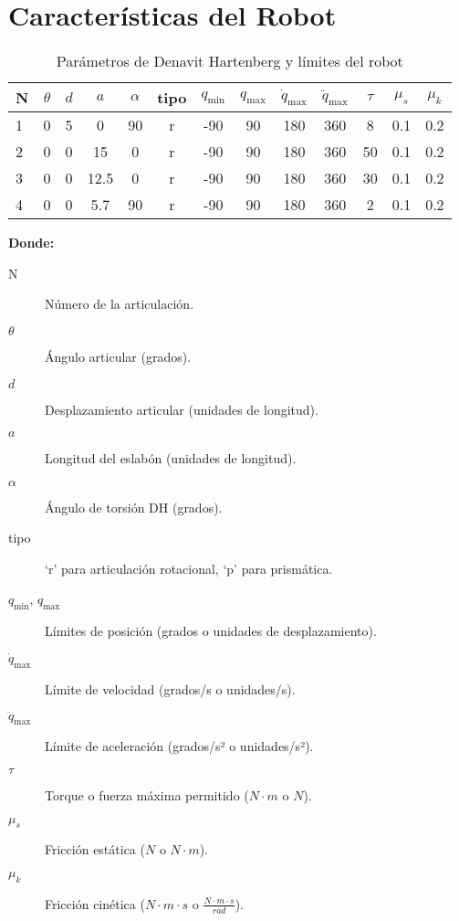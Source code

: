 \section{Características del Robot} \label{sec:caracteristicas_del_robot}


\begin{table}[ht]
	\centering
	\caption{Parámetros de Denavit Hartenberg y límites del robot}
	\label{tab:parametros_robot}
	\begin{tabular}{ l|cccccccccccc
		}
		\toprule
		N & {$\theta$} & {$d$} & {$a$} & {$\alpha$} & {tipo} 
		& {$q_{\min}$} & {$q_{\max}$} 
		& {$\dot q_{\max}$} & {$\ddot q_{\max}$} 
		& {$\tau$} & {$\mu_s$} & {$\mu_k$} \\
		\midrule
		1 & 0 & 5 & 0  & 90   & r & -90 & 90 & 180 & 360 &  8  & 0.1 & 0.2 \\
		2 & 0 & 0 & 15  & 0 & r & -90 & 90 & 180 & 360 & 50  & 0.1 & 0.2 \\
		3 & 0 & 0 & 12.5  & 0 & r & -90 & 90 & 180 & 360 & 30  & 0.1 & 0.2 \\
		4 & 0 & 0 & 5.7  & 90   & r &   -90 &  90 &   180 &   360 & 2  & 0.1 & 0.2 \\
		\bottomrule
	\end{tabular}
\end{table}
\bigskip
\noindent
\textbf{Donde:}
\begin{description}
	\item[N] Número de la articulación.
	\item[\(\theta\)] Ángulo articular (grados).
	\item[\(d\)] Desplazamiento articular (unidades de longitud).
	\item[\(a\)] Longitud del eslabón (unidades de longitud).
	\item[\(\alpha\)] Ángulo de torsión DH (grados).
	\item[tipo] ‘r’ para articulación rotacional, ‘p’ para prismática.
	\item[\(q_{\min}\), \(q_{\max}\)] Límites de posición (grados o unidades de desplazamiento).
	\item[\(\dot q_{\max}\)] Límite de velocidad (grados/s o unidades/s).
	\item[\(\ddot q_{\max}\)] Límite de aceleración (grados/s² o unidades/s²).
	\item[\(\tau\)] Torque o fuerza máxima permitido (\(N \cdot m\) o \(N\)).
	\item[\(\mu_s\)] Fricción estática (\(N\) o \(N \cdot m\)).
	\item[\(\mu_k\)] Fricción cinética (\(N \cdot m \cdot s\) o \(\frac{N \cdot m \cdot s}{rad}\)).
\end{description}

